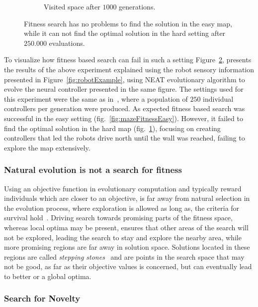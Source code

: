 \begin{figure}[t!]
\begin{subfigure}[b]{0.3\textwidth}
\caption{Visited space after $1000$ generations.}
\label{fig:mazeFitnessHard}
\end{subfigure}
\caption{Fitness search has no problems to find the solution in the easy map, while it can not find the optimal solution in the hard setting after $250.000$ evaluations.}
\label{fig:mazeFitness}
\end{figure}


To visualize how fitness based search can fail in such a setting Figure~\ref{fig:mazeFitness}, presents the results of the above experiment explained using the robot sensory information presented in Figure~\ref{fig:robotExample}, using NEAT evolutionary algorithm to evolve the neural controller presented in the same figure. The settings used for this experiment were the same as in~\citep{lehman2011abandoning}, where a population of $250$ individual controllers per generation were produced. As expected fitness based search was successful in the easy setting (fig.~\ref{fig:mazeFitnessEasy}). However, it failed to find the optimal solution in the hard map (fig.~\ref{fig:mazeFitnessHard}), focusing on creating controllers that led the robots drive north until the wall was reached, failing to explore the map extensively.

\subsubsection*{Natural evolution is not a search for fitness}

Using an objective function in evolutionary computation and typically reward individuals which are closer to an objective, is far away from natural selection in the evolution process, where exploration is allowed as long as, the criteria for survival hold~\citep{lehman2010revising}. Driving search towards promising parts of the fitness space, whereas local optima may be present, ensures that other areas of the search will not be explored, leading the search to stay and explore the nearby area, while more promising regions are far away in solution space. Solutions located in these regions are called \emph{stepping stones}~\citep{lehman2008exploiting,lehman2011abandoning,lehman2010revising,risi2009novelty} and are points in the search space that may not be good, as far as their objective values is concerned, but can eventually lead to better or a global optima.


\subsubsection*{Search for Novelty}

